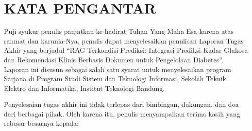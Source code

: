 \chapter*{KATA PENGANTAR}

Puji syukur penulis panjatkan ke hadirat Tuhan Yang Maha Esa karena atas rahmat dan karunia-Nya, penulis dapat menyelesaikan penulisan Laporan Tugas Akhir yang berjudul ``RAG Terkondisi-Prediksi: Integrasi Prediksi Kadar Glukosa dan Rekomendasi Klinis Berbasis Dokumen untuk Pengelolaan Diabetes''. Laporan ini disusun sebagai salah satu syarat untuk menyelesaikan program Sarjana di Program Studi Sistem dan Teknologi Informasi, Sekolah Teknik Elektro dan Informatika, Institut Teknologi Bandung.

Penyelesaian tugas akhir ini tidak terlepas dari bimbingan, dukungan, dan doa dari berbagai pihak. Oleh karena itu, penulis menyampaikan terima kasih yang sebesar-besarnya kepada:
